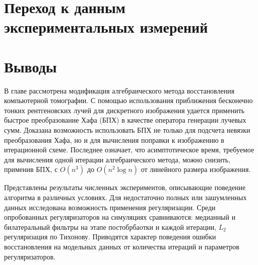 \section{Переход к данным экспериментальных измерений}


\section{Выводы}
В главе рассмотрена модификация алгебраического метода восстановления компьютерной томографии.
С помощью использования приближения бесконечно тонких рентгеновских лучей для дискретного изображения удается применить быстрое преобразование Хафа (БПХ) в качестве оператора генерации лучевых сумм.
Доказана возможность использовать БПХ не только для подсчета невязки преобразования Хафа, но и для вычисления поправки к изображению в итерационной схеме.
Последнее означает, что асимптотическое время, требуемое для вычисления одной итерации алгебраического метода, можно снизить, применив БПХ, с $O(n^3)$ до $O(n^2 \log n)$ от линейного размера изображения.

Представлены результаты численных экспериментов, описывающие поведение алгоритма в различных условиях.
Для недостаточно полных или зашумленных данных исследована возможность применения регуляризации.
Среди опробованных регуляризаторов на симуляциях сравниваются: медианный и билатеральный фильтры на этапе постобрбаотки и каждой итерации, $L_2$ регуляризация по Тихонову.
Приводятся характер поведения ошибки восстановления на модельных данных от количества итераций и параметров регуляризаторов.
